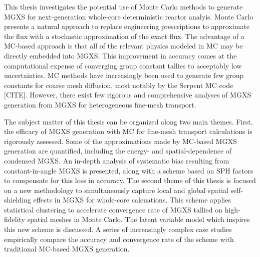 This thesis investigates the potential use of Monte Carlo methods to generate \ac{MGXS} for next-generation whole-core deterministic reactor analyis. Monte Carlo presents a natural approach to replace engineering prescriptions to approximate the flux with a stochastic approximation of the exact flux. The advantage of a \ac{MC}-based approach is that all of the relevant physics modeled in \ac{MC} may be directly embedded into \ac{MGXS}. This improvement in accuracy comes at the computational expense of converging group constant tallies to acceptably low uncertainties. \ac{MC} methods have increasingly been used to generate few group constants for coarse mesh diffusion, most notably by the Serpent \ac{MC} code [CITE]. However, there exist few rigorous and comprehensive analyses of \ac{MGXS} generation from \ac{MGXS} for heterogeneous fine-mesh transport.

The subject matter of this thesis can be organized along two main themes. First, the efficacy of \ac{MGXS} generation with \ac{MC} for fine-mesh transport calculations is rigorously assessed. Some of the approximations made by \ac{MC}-based \ac{MGXS} generation are quantified, including the energy- and spatial-dependence of condensed \ac{MGXS}. An in-depth analysis of systematic bias resulting from constant-in-angle \ac{MGXS} is presented, along with a scheme based on \ac{SPH} factors to compensate for this loss in accuracy. The second theme of this thesis is focused on a new methodology to simultaneously capture local and global spatial self-shielding effects in \ac{MGXS} for whole-core calcuations. This scheme applies statistical clustering to accelerate convergence rate of \ac{MGXS} tallied on high-fidelity spatial meshes in Monte Carlo. The latent variable model which inspires this new scheme is discussed. A series of increasingly complex case studies empirically compare the accuracy and convergence rate of the scheme with traditional \ac{MC}-based MGXS generation.



